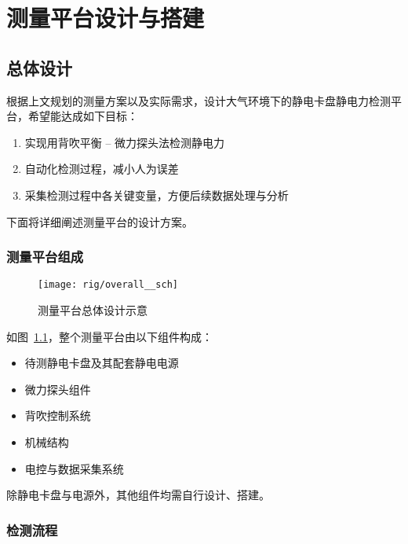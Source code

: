 \chapter{测量平台设计与搭建}



\section{总体设计}\label{sec:rig-overall}

根据上文规划的测量方案以及实际需求，设计大气环境下的静电卡盘静电力检测平台，希望能达成如下目标：

\begin{enumerate}
  \item 实现用背吹平衡 -- 微力探头法检测静电力
  \item 自动化检测过程，减小人为误差
  \item 采集检测过程中各关键变量，方便后续数据处理与分析
\end{enumerate}

下面将详细阐述测量平台的设计方案。


\subsection{测量平台组成}\label{sec:rig-overall-comp}

\begin{figure}[tbh]
\centering
\texttt{[image: rig/overall\_\_sch]}
\caption{测量平台总体设计示意}
\label{fig:rig-overall-sch}
\end{figure}

如图~\ref{fig:rig-overall-sch}，整个测量平台由以下组件构成：

\begin{itemize}
  \item 待测静电卡盘及其配套静电电源
  \item 微力探头组件
  \item 背吹控制系统
  \item 机械结构
  \item 电控与数据采集系统
\end{itemize}

除静电卡盘与电源外，其他组件均需自行设计、搭建。


\subsection{检测流程}\label{sec:rig-overall-proc}

